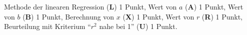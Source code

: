 \begin{bewertung}
Methode der linearen Regression ({\bf L}) 1 Punkt,
Wert von $a$ ({\bf A}) 1 Punkt,
Wert von $b$ ({\bf B}) 1 Punkt,
Berechnung von $x$ ({\bf X}) 1 Punkt,
Wert von $r$ ({\bf R}) 1 Punkt,
Beurteilung mit Kriterium ``$r^2$ nahe bei 1'' ({\bf U}) 1 Punkt.
\end{bewertung}


